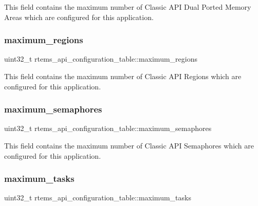 This field contains the maximum number of Classic A\+PI Dual Ported Memory Areas which are configured for this application. \mbox{\label{structrtems__api__configuration__table_ab84d6d812bd85b907547f24bd95f9f0b}} 
\subsubsection{\texorpdfstring{maximum\_regions}{maximum\_regions}}
{\footnotesize\ttfamily uint32\+\_\+t rtems\+\_\+api\+\_\+configuration\+\_\+table\+::maximum\+\_\+regions}

This field contains the maximum number of Classic A\+PI Regions which are configured for this application. \mbox{\label{structrtems__api__configuration__table_a00ef2e0c0248d3bdf3b13c0864757f06}} 
\subsubsection{\texorpdfstring{maximum\_semaphores}{maximum\_semaphores}}
{\footnotesize\ttfamily uint32\+\_\+t rtems\+\_\+api\+\_\+configuration\+\_\+table\+::maximum\+\_\+semaphores}

This field contains the maximum number of Classic A\+PI Semaphores which are configured for this application. \mbox{\label{structrtems__api__configuration__table_a2cccd897b4249543014688c2105466fa}} 
\subsubsection{\texorpdfstring{maximum\_tasks}{maximum\_tasks}}
{\footnotesize\ttfamily uint32\+\_\+t rtems\+\_\+api\+\_\+configuration\+\_\+table\+::maximum\+\_\+tasks}

